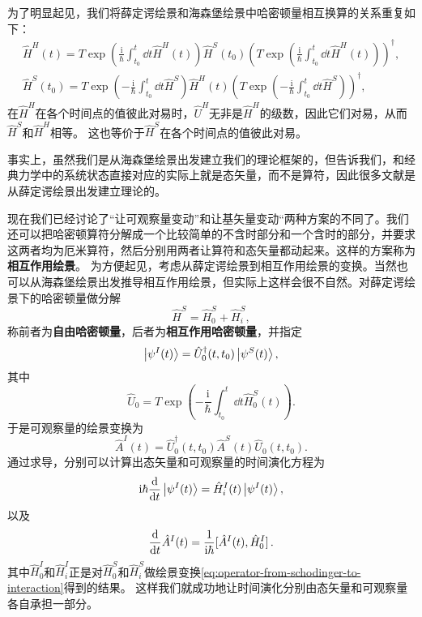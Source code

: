 \documentclass[hyperref, UTF8, a4paper]{ctexart}
\newcommand*{\ii}{\mathrm{i}}
\renewcommand{\autoref}{\prettyref}
\begin{document}
为了明显起见，我们将薛定谔绘景和海森堡绘景中哈密顿量相互换算的关系重复如下：
\begin{equation}
    \begin{aligned}
        \hat{H}^H(t) = T \exp \left( \frac{\ii}{\hbar} \int_{t_0}^t \dd{t} \hat{H}^H(t) \right) \hat{H}^S(t_0) \left(T \exp \left( \frac{\ii}{\hbar} \int_{t_0}^t \dd{t} \hat{H}^H(t) \right)\right)^\dagger, \\
        \hat{H}^S(t_0) = T \exp \left( - \frac{\ii}{\hbar} \int_{t_0}^t \dd{t} \hat{H}^S \right) \hat{H}^H(t) \left( T \exp \left( - \frac{\ii}{\hbar} \int_{t_0}^t \dd{t} \hat{H}^S \right)\right)^\dagger,
    \end{aligned}
\end{equation}
在$\hat{H}^H$在各个时间点的值彼此对易时，$\hat{U}^H$无非是$\hat{H}^H$的级数，因此它们对易，从而$\hat{H}^S$和$\hat{H}^H$相等。
这也等价于$\hat{H}^S$在各个时间点的值彼此对易。

事实上，虽然我们是从海森堡绘景出发建立我们的理论框架的，但\autoref{sec:back-to-classical}告诉我们，和经典力学中的系统状态直接对应的实际上就是态矢量，而不是算符，因此很多文献是从薛定谔绘景出发建立理论的。

现在我们已经讨论了“让可观察量变动”和让基矢量变动“两种方案的不同了。我们还可以把哈密顿算符分解成一个比较简单的不含时部分和一个含时的部分，并要求这两者均为厄米算符，然后分别用两者让算符和态矢量都动起来。这样的方案称为\textbf{相互作用绘景}。
为方便起见，考虑从薛定谔绘景到相互作用绘景的变换。当然也可以从海森堡绘景出发推导相互作用绘景，但实际上这样会很不自然。对薛定谔绘景下的哈密顿量做分解
\begin{equation}
    \hat{H}^S = \hat{H}_0^S + \hat{H}_i^S,
\end{equation}
称前者为\textbf{自由哈密顿量}，后者为\textbf{相互作用哈密顿量}，并指定
\begin{equation}
    \ket{\psi^I(t)} = \hat{U}_0^\dagger(t,t_0) \ket{\psi^S(t)},
\end{equation}
其中
\begin{equation}
    \hat{U}_0 = T \exp \left( - \frac{\ii}{\hbar} \int_{t_0}^t \dd{t} \hat{H}_0^S(t) \right).
\end{equation}
于是可观察量的绘景变换为
\begin{equation}
    \hat{A}^I(t) = \hat{U}_0^\dagger(t,t_0) \hat{A}^S(t) \hat{U}_0(t,t_0).
    \label{eq:operator-from-schodinger-to-interaction}
\end{equation}
通过求导，分别可以计算出态矢量和可观察量的时间演化方程为
\begin{equation}
    \ii \hbar \dv{t} \ket{\psi^I(t)} = \hat{H}^I_i(t) \ket{\psi^I(t)},
    \label{eq:time-evolution-in-interation-picture}
\end{equation}
以及
\begin{equation}
    \dv{t} \hat{A}^I(t) = \frac{1}{\ii \hbar} \comm*{\hat{A}^I(t)}{\hat{H}_0^I}.
\end{equation}
其中$\hat{H}_0^I$和$\hat{H}_i^I$正是对$\hat{H}_0^S$和$\hat{H}_i^S$做绘景变换\eqref{eq:operator-from-schodinger-to-interaction}得到的结果。
这样我们就成功地让时间演化分别由态矢量和可观察量各自承担一部分。
\end{document}
